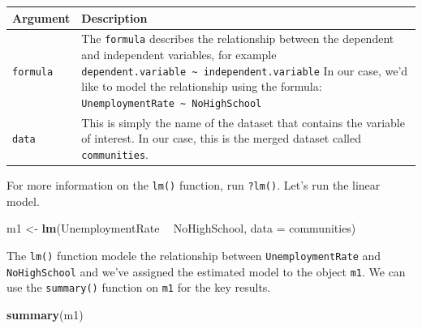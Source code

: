 \documentclass[]{article}
\newenvironment{Shaded}{\begin{snugshade}}{\end{snugshade}}
\newcommand{\DataTypeTok}[1]{\textcolor[rgb]{0.13,0.29,0.53}{#1}}
\newcommand{\KeywordTok}[1]{\textcolor[rgb]{0.13,0.29,0.53}{\textbf{#1}}}
\newcommand{\NormalTok}[1]{#1}
\newcommand{\OperatorTok}[1]{\textcolor[rgb]{0.81,0.36,0.00}{\textbf{#1}}}
\newcommand{\StringTok}[1]{\textcolor[rgb]{0.31,0.60,0.02}{#1}}
\begin{document}
\begin{longtable}[]{@{}ll@{}}
\toprule
\begin{minipage}[b]{0.11\columnwidth}\raggedright
Argument\strut
\end{minipage} & \begin{minipage}[b]{0.83\columnwidth}\raggedright
Description\strut
\end{minipage}\tabularnewline
\midrule
\endhead
\begin{minipage}[t]{0.11\columnwidth}\raggedright
\texttt{formula}\strut
\end{minipage} & \begin{minipage}[t]{0.83\columnwidth}\raggedright
The \texttt{formula} describes the relationship between the dependent and independent variables, for example \texttt{dependent.variable\ \textasciitilde{}\ independent.variable} In our case, we'd like to model the relationship using the formula: \texttt{UnemploymentRate\ \textasciitilde{}\ NoHighSchool}\strut
\end{minipage}\tabularnewline
\begin{minipage}[t]{0.11\columnwidth}\raggedright
\texttt{data}\strut
\end{minipage} & \begin{minipage}[t]{0.83\columnwidth}\raggedright
This is simply the name of the dataset that contains the variable of interest. In our case, this is the merged dataset called \texttt{communities}.\strut
\end{minipage}\tabularnewline
\bottomrule
\end{longtable}

For more information on the \texttt{lm()} function, run \texttt{?lm()}. Let's run the linear model.

\begin{Shaded}
\begin{Highlighting}[]
\NormalTok{m1 <-}\StringTok{ }\KeywordTok{lm}\NormalTok{(UnemploymentRate }\OperatorTok{~}\StringTok{ }\NormalTok{NoHighSchool, }\DataTypeTok{data =}\NormalTok{ communities)}
\end{Highlighting}
\end{Shaded}

The \texttt{lm()} function modele the relationship between \texttt{UnemploymentRate} and \texttt{NoHighSchool} and we've assigned the estimated model to the object \texttt{m1}. We can use the \texttt{summary()} function on \texttt{m1} for the key results.

\begin{Shaded}
\begin{Highlighting}[]
\KeywordTok{summary}\NormalTok{(m1)}
\end{Highlighting}
\end{Shaded}
\end{document}
